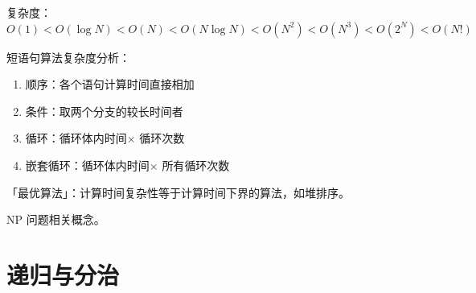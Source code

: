 \documentclass[UTF8]{ctexart}
\newcommand\Emph[1]{\textcolor{cyan!80!black}{#1}}
\begin{document}
复杂度：$O(1) < O(\log N) < O(N) < O(N\log N) < O(N^2) < O(N^3) < O(2^N) < O(N!)$

短语句算法复杂度分析：
\begin{enumerate}[itemsep=0pt,parsep=0pt,leftmargin=1.5cm]
  \item 顺序：各个语句计算时间直接相加
  \item 条件：取两个分支的较长时间者
  \item 循环：循环体内时间$\times$ 循环次数
  \item 嵌套循环：循环体内时间$\times$ \Emph{所有}循环次数
\end{enumerate}

「最优算法」：计算时间复杂性等于计算时间下界的算法，如堆排序。

NP 问题相关概念。


\section{递归与分治}
\end{document}
